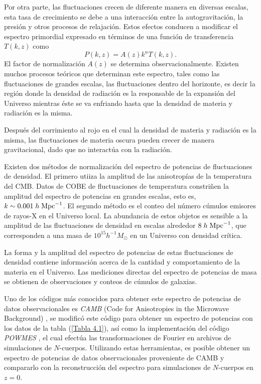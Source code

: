 \documentclass[a4paper,openright,10pt, oneside, final]{book}
\begin{document}
Por otra parte, las fluctuaciones crecen de diferente manera en diversas escalas, esta tasa de crecimiento se debe a una interacción entre la autogravitación, la presión y otros procesos de relajación. Estos efectos conducen a modificar el espectro primordial expresado en términos de una función de transferencia $T(k,z)$ como
\begin{equation}
P(k,z) = A(z)k^{n}T(k,z).\label{eqn 4.14}
\end{equation}
El factor de normalización $A(z)$ se determina observacionalmente. Existen muchos procesos teóricos que determinan este espectro, tales como las fluctuaciones de grandes escalas, las fluctuaciones dentro del horizonte, es decir la región donde la densidad de radiación es la responsable de la expansión del Universo mientras éste se va enfriando hasta que la densidad de materia y radiación es la misma.

Después del corrimiento al rojo en el cual la densidad de materia y radiación es la misma, las fluctuaciones de materia oscura pueden crecer de manera gravitacional, dado que no interactúa con la radiación.

Existen dos métodos de normalización del espectro de potencias de fluctuaciones de densidad. El primero utiiza la amplitud de las anisotropías de la temperatura del CMB. Datos de COBE de fluctuaciones de temperatura constriñen la amplitud del espectro de potencias en grandes escalas, esto es, $k \sim 0.001 \; h \; \textup{Mpc}^{-1}$. El segundo método es el conteo del número cúmulos emisores de rayos-X en el Universo local. La abundancia de estos objetos es sensible a la amplitud de las fluctuaciones de densidad en escalas alrededor $8 \; h \; \textup{Mpc}^{-1}$, que corresponden a una masa de $10^{15}h^{-1}M_{\odot}$ en un Universo con densidad crítica. 

La forma y la amplitud del espectro de potencias de estas fluctuaciones de densidad contiene información acerca de la cantidad y comportamiento de la materia en el Universo. Las mediciones directas del espectro de potencias de masa se obtienen de observaciones y conteos de cúmulos de galaxias. 

Uno de los códigos más conocidos para obtener este espectro de potencias de datos observacionales es \textit{CAMB} (Code for Anisotropies in the Microwave Background) \cite{4.3.1}, se modificó este código para obtener un espectro de potencias con los datos de la tabla (\ref{Tabla 4.1}),  así como la implementación del código \textit{POWMES} \cite{4.5}, el cual efectúa las transformaciones de Fourier en archivos de simulaciones de $N$-cuerpos. Utilizando estas herramientas, es posible obtener un espectro de potencias de datos observacionales proveniente de CAMB y compararlo con la reconstrucción del espectro para simulaciones de $N$-cuerpos en $z=0$.
\end{document}
